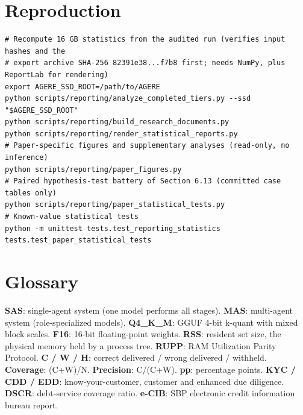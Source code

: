 \documentclass[letterpaper]{article}
\begin{document}
\section{Reproduction}\label{appendix-b.-reproduction}

\begin{lstlisting}
# Recompute 16 GB statistics from the audited run (verifies input hashes and the
# export archive SHA-256 82391e38...f7b8 first; needs NumPy, plus ReportLab for rendering)
export AGERE_SSD_ROOT=/path/to/AGERE
python scripts/reporting/analyze_completed_tiers.py --ssd "$AGERE_SSD_ROOT"
python scripts/reporting/build_research_documents.py
python scripts/reporting/render_statistical_reports.py
# Paper-specific figures and supplementary analyses (read-only, no inference)
python scripts/reporting/paper_figures.py
# Paired hypothesis-test battery of Section 6.13 (committed case tables only)
python scripts/reporting/paper_statistical_tests.py
# Known-value statistical tests
python -m unittest tests.test_reporting_statistics tests.test_paper_statistical_tests
\end{lstlisting}

\section{Glossary}\label{appendix-c.-glossary}

\textbf{SAS}: single-agent system (one model performs all stages). \textbf{MAS}: multi-agent system (role-specialized models). \textbf{Q4\_K\_M}: GGUF 4-bit k-quant with mixed block scales. \textbf{F16}: 16-bit floating-point weights. \textbf{RSS}: resident set size, the physical memory held by a process tree. \textbf{RUPP}: RAM Utilization Parity Protocol. \textbf{C / W / H}: correct delivered / wrong delivered / withheld. \textbf{Coverage}: (C+W)/N. \textbf{Precision}: C/(C+W). \textbf{pp}: percentage points. \textbf{KYC / CDD / EDD}: know-your-customer, customer and enhanced due diligence. \textbf{DSCR}: debt-service coverage ratio. \textbf{e-CIB}: SBP electronic credit information bureau report.
\end{document}
